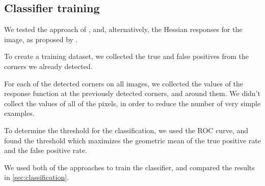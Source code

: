 \subsection{Classifier training}\label{sub:classifier_training}

We tested the approach of \cite{geigerAutomaticCameraRange2012}, and,
alternatively, the Hessian responses for the image, as proposed by
\cite{chenNewSubPixelDetector2005}.

To create a training dataset, we collected the true and false positives from the
corners we already detected.

For each of the detected corners on all images, we collected the values of the
response function at the previously detected corners, and around them.
We didn't collect the values of all of the pixels, in order to reduce the number
of very simple examples.

To determine the threshold for the classification, we used the ROC curve, and
found the threshold which maximizes
the geometric mean of the true positive rate and the false positive rate.

We used both of the approaches to train the classifier, and compared the
results in \cref{sec:classification}.


